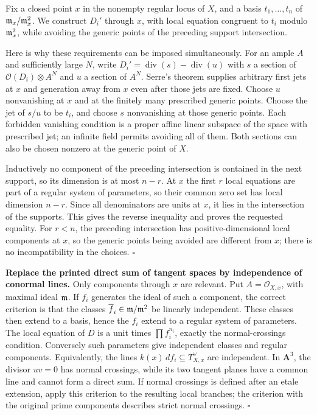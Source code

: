 \documentclass[11pt]{article}
\let\chapterexercise\exercise
\renewcommand{\exercise}[2]{\Needspace{8\baselineskip}\chapterexercise{#1}{#2}}
\begin{document}
\pf Fix a closed point $x$ in the nonempty regular locus of $X$, and a basis $t_1,\ldots,t_n$ of $\mathfrak m_x/\mathfrak m_x^2$. We construct $D_i'$ through $x$, with local equation congruent to $t_i$ modulo $\mathfrak m_x^2$, while avoiding the generic points of the preceding support intersection.

Here is why these requirements can be imposed simultaneously. For an ample $A$ and sufficiently large $N$, write $D_i'=\operatorname{div}(s)-\operatorname{div}(u)$ with $s$ a section of $\mathcal O(D_i)\otimes A^N$ and $u$ a section of $A^N$. Serre's theorem supplies arbitrary first jets at $x$ and generation away from $x$ even after those jets are fixed. Choose $u$ nonvanishing at $x$ and at the finitely many prescribed generic points. Choose the jet of $s/u$ to be $t_i$, and choose $s$ nonvanishing at those generic points. Each forbidden vanishing condition is a proper affine linear subspace of the space with prescribed jet; an infinite field permits avoiding all of them. Both sections can also be chosen nonzero at the generic point of $X$.

Inductively no component of the preceding intersection is contained in the next support, so its dimension is at most $n-r$. At $x$ the first $r$ local equations are part of a regular system of parameters, so their common zero set has local dimension $n-r$. Since all denominators are units at $x$, it lies in the intersection of the supports. This gives the reverse inequality and proves the requested equality. For $r<n$, the preceding intersection has positive-dimensional local components at $x$, so the generic points being avoided are different from $x$; there is no incompatibility in the choices. \hfill$\square$

\pf \textbf{Replace the printed direct sum of tangent spaces by independence of conormal lines.} Only components through $x$ are relevant. Put $A=\mathcal O_{X,x}$, with maximal ideal $\mathfrak m$. If $f_i$ generates the ideal of such a component, the correct criterion is that the classes $\overline f_i\in\mathfrak m/\mathfrak m^2$ be linearly independent. These classes then extend to a basis, hence the $f_i$ extend to a regular system of parameters. The local equation of $D$ is a unit times $\prod f_i^{n_i}$, exactly the normal-crossings condition. Conversely such parameters give independent classes and regular components. Equivalently, the lines $k(x)\,df_i\subseteq T_{X,x}^{\vee}$ are independent. In $\mathbf A^3$, the divisor $uv=0$ has normal crossings, while its two tangent planes have a common line and cannot form a direct sum. If normal crossings is defined after an etale extension, apply this criterion to the resulting local branches; the criterion with the original prime components describes strict normal crossings. \hfill$\square$
\end{document}
